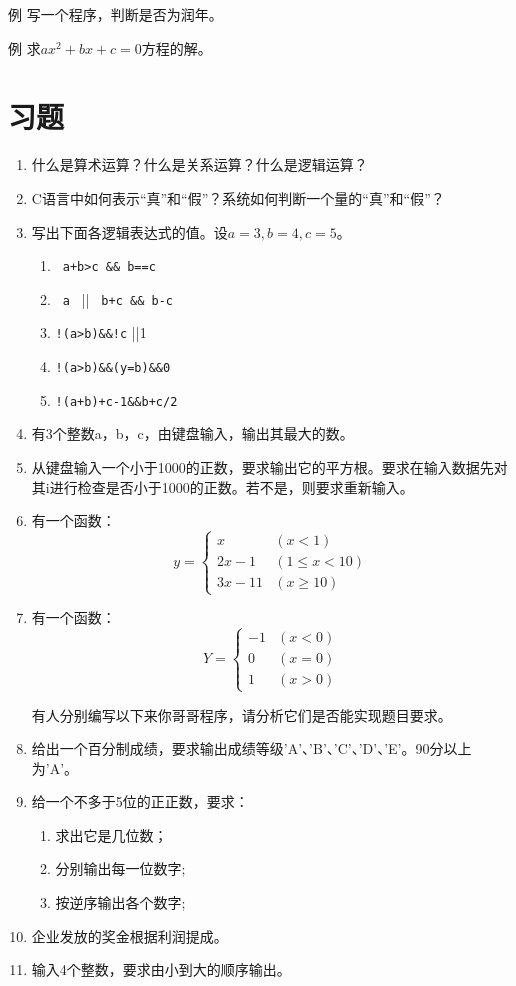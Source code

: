 例 写一个程序，判断是否为润年。

例 求$ax^2 + bx + c = 0$方程的解。
\section{习题}
\begin{enumerate}
	\item 什么是算术运算？什么是关系运算？什么是逻辑运算？
	\item C语言中如何表示“真”和“假”？系统如何判断一个量的“真”和“假”？
	\item 写出下面各逻辑表达式的值。设$a=3,b=4,c=5$。
		\begin{enumerate}
			\item \verb| a+b>c && b==c|
			\item \verb| a | || \verb| b+c && b-c| 
			\item \verb|!(a>b)&&!c| ||1 
			\item \verb|!(a>b)&&(y=b)&&0|
			\item \verb|!(a+b)+c-1&&b+c/2|
		\end{enumerate}
	\item 有3个整数a，b，c，由键盘输入，输出其最大的数。
	\item 从键盘输入一个小于1000的正数，要求输出它的平方根。要求在输入数据先对其i进行检查是否小于1000的正数。若不是，则要求重新输入。
	\item 有一个函数：
		\begin{equation} y = 
				\begin{cases}
					x & (x < 1) \\
					2x -1 & (1 \leqslant x < 10) \\
					3x - 11 & (x \geqslant 10) 
				\end{cases}
		\end{equation}
	\item 有一个函数：
		\begin{equation} Y = 
			\begin{cases}
				-1	&	(x < 0)	\\
				0	&	(x = 0)	\\
				1	&	(x > 0)
			\end{cases}
		\end{equation}

		有人分别编写以下来你哥哥程序，请分析它们是否能实现题目要求。
	\item 给出一个百分制成绩，要求输出成绩等级'A'、'B'、'C'、'D'、'E'。90分以上为'A'。
	\item 给一个不多于5位的正正数，要求：
		\begin{enumerate}
			\item 求出它是几位数；
			\item 分别输出每一位数字;
			\item 按逆序输出各个数字;
		\end{enumerate}
	\item 企业发放的奖金根据利润提成。
	\item 输入4个整数，要求由小到大的顺序输出。
\end{enumerate}
